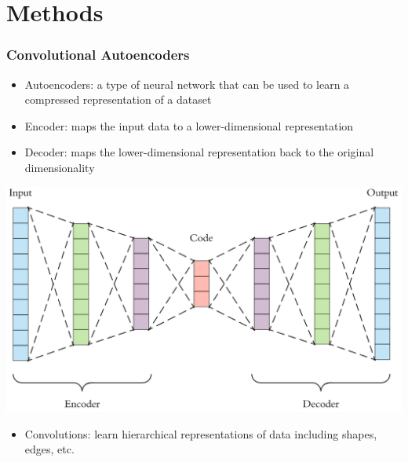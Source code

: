 \documentclass{beamer}
\begin{document}
\section{Methods}
\begin{frame}
	\frametitle{Convolutional Autoencoders}
	\begin{itemize}
		\item Autoencoders: a type of neural network that can be used to learn a compressed representation of a dataset
		\item Encoder: maps the input data to a lower-dimensional representation
		\item Decoder: maps the lower-dimensional representation back to the original dimensionality
	\end{itemize}
	\begin{center}
		\includegraphics[scale=0.1]{autoencoder.png}
	\end{center}
	\begin{itemize}
		\item Convolutions: learn hierarchical representations of data including shapes, edges, etc.
	\end{itemize}
\end{frame}
\end{document}
